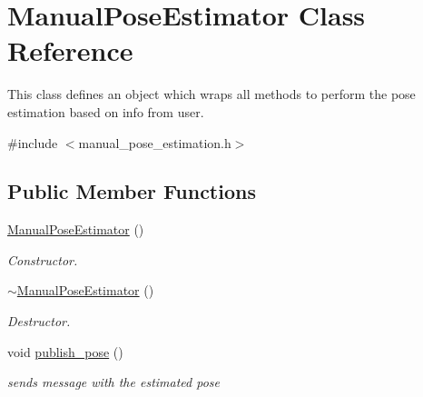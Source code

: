 \hypertarget{classManualPoseEstimator}{}\section{Manual\+Pose\+Estimator Class Reference}
\label{classManualPoseEstimator}


This class defines an object which wraps all methods to perform the pose estimation based on info from user.  




{\ttfamily \#include $<$manual\+\_\+pose\+\_\+estimation.\+h$>$}

\subsection*{Public Member Functions}
\begin{DoxyCompactItemize}
\item 
\mbox{\label{classManualPoseEstimator_aa7ca58da3b62a0dcef1ad72c5045347e}} 
\hyperlink{classManualPoseEstimator_aa7ca58da3b62a0dcef1ad72c5045347e}{Manual\+Pose\+Estimator} ()
\begin{DoxyCompactList}\small\item\em Constructor. \end{DoxyCompactList}\item 
\mbox{\label{classManualPoseEstimator_a620324d78a3cfa946fe99ea7b647eb00}} 
\hyperlink{classManualPoseEstimator_a620324d78a3cfa946fe99ea7b647eb00}{$\sim$\+Manual\+Pose\+Estimator} ()
\begin{DoxyCompactList}\small\item\em Destructor. \end{DoxyCompactList}\item 
\mbox{\label{classManualPoseEstimator_a838f7f52d105ee50f22058cb7ceca527}} 
void \hyperlink{classManualPoseEstimator_a838f7f52d105ee50f22058cb7ceca527}{publish\+\_\+pose} ()
\begin{DoxyCompactList}\small\item\em sends message with the estimated pose \end{DoxyCompactList}\end{DoxyCompactItemize}
